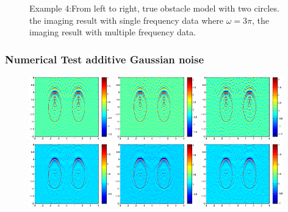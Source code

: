 \documentclass[cjk,8pt]{beamer}
\newcommand{\om}{\omega}
\begin{document}
\begin{CJK*}{GBK}{kai}
\begin{frame}
\begin{figure}[h]
	\caption{Example 4:From left to right,  true obstacle model with two circles. the imaging result
		with single frequency data where $\om=3\pi$, the imaging result with multiple frequency data.}
\end{figure}
\end{frame}

\begin{frame}
\frametitle{Numerical Test additive Gaussian noise}
\begin{figure}[h]
	\centering
	\includegraphics[width=0.32\textwidth]{./graphic/bi_circle_4pi_error2.eps}
	\includegraphics[width=0.32\textwidth]{./graphic/bi_circle_4pi_error4.eps}
	\includegraphics[width=0.32\textwidth]{./graphic/bi_circle_4pi_error6.eps}\\
	\includegraphics[width=0.32\textwidth]{./graphic/bi_circle_multi_2_8_error2.eps}
	\includegraphics[width=0.32\textwidth]{./graphic/bi_circle_multi_2_8_error4.eps}
	\includegraphics[width=0.32\textwidth]{./graphic/bi_circle_multi_2_8_error6.eps}
	

\end{figure}
\end{frame}
\end{CJK*}
\end{document}
